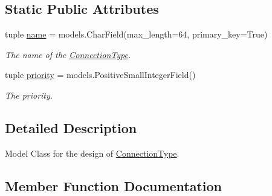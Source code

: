 \subsection*{Static Public Attributes}
\begin{DoxyCompactItemize}
\item 
\hypertarget{classrestriction__system_1_1models_1_1ConnectionType_ad74dd935aa0b1c0286348a5a8329a360}{}tuple \hyperlink{classrestriction__system_1_1models_1_1ConnectionType_ad74dd935aa0b1c0286348a5a8329a360}{name} = models.\+Char\+Field(max\+\_\+length=64, primary\+\_\+key=True)\label{classrestriction__system_1_1models_1_1ConnectionType_ad74dd935aa0b1c0286348a5a8329a360}

\begin{DoxyCompactList}\small\item\em The name of the \hyperlink{classrestriction__system_1_1models_1_1ConnectionType}{Connection\+Type}. \end{DoxyCompactList}\item 
\hypertarget{classrestriction__system_1_1models_1_1ConnectionType_a5251c05c93cc4ccc0fe095280b121aa0}{}tuple \hyperlink{classrestriction__system_1_1models_1_1ConnectionType_a5251c05c93cc4ccc0fe095280b121aa0}{priority} = models.\+Positive\+Small\+Integer\+Field()\label{classrestriction__system_1_1models_1_1ConnectionType_a5251c05c93cc4ccc0fe095280b121aa0}

\begin{DoxyCompactList}\small\item\em The priority. \end{DoxyCompactList}\end{DoxyCompactItemize}


\subsection{Detailed Description}
Model Class for the design of \hyperlink{classrestriction__system_1_1models_1_1ConnectionType}{Connection\+Type}. 

\subsection{Member Function Documentation}
\hypertarget{classrestriction__system_1_1models_1_1ConnectionType_adb44bcf0372bbb9d76ecde6b7dacded4}{}
